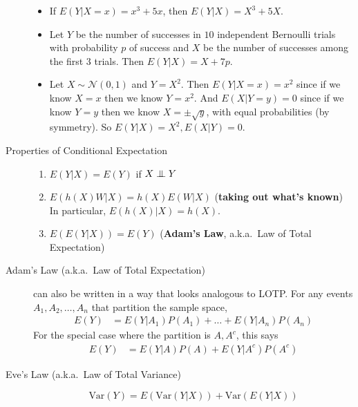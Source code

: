 \documentclass[10pt,landscape]{article}
\newcommand\independent{\protect\mathpalette{\protect\independenT}{\perp}}
\def\independenT#1#2{\mathrel{\setbox0\hbox{$#1#2$}%
    \copy0\kern-\wd0\mkern4mu\box0}}
\newcommand{\var}{\textrm{Var}}
\newcommand{\N}{\mathcal{N}}
\begin{document}
\begin{multicols*}{3}
\begin{description}
        \begin{itemize}
            \item If $E(Y|X=x) = x^3+5x$, then $E(Y|X) = X^3 + 5X$.
            \item Let $Y$ be the number of successes in $10$ independent Bernoulli trials with probability $p$ of success and $X$ be the number of successes among the first $3$ trials. Then $E(Y|X)=X+7p$.
            \item Let $X \sim \N(0,1)$ and $Y=X^2$. Then $E(Y|X=x) = x^2$ since if we know $X=x$ then we know $Y=x^2$. And $E(X|Y=y) = 0$ since if we know $Y=y$ then we know $X = \pm \sqrt{y}$, with equal probabilities (by symmetry). So $E(Y|X)=X^2, E(X|Y)=0$.  
        \end{itemize} 
                                                    
        \item[Properties of Conditional Expectation] \quad
        \begin{enumerate}
            \item $E(Y|X) = E(Y)$ if $X \independent Y$
            \item $E(h(X)W|X) = h(X)E(W|X)$ (\textbf{taking out what's known}) \\
                  In particular, $E(h(X)|X) = h(X)$.
            \item $E(E(Y|X)) = E(Y)$ (\textbf{Adam's Law}, a.k.a.~Law of Total Expectation)
        \end{enumerate}
                                                
        \item[Adam's Law (a.k.a.~Law of Total Expectation)]  can also be written in a way that looks analogous to LOTP. For any events $A_1, A_2, \dots, A_n$ that partition the sample space, 
        \begin{align*}
            E(Y) & = E(Y|A_1)P(A_1) + \dots + E(Y|A_n)P(A_n) 
        \end{align*}
        For the special case where the partition is $A, A^c$, this says
        \begin{align*}
            E(Y) & = E(Y|A)P(A) + E(Y|A^c)P(A^c) 
        \end{align*}
                                                
        \item[Eve's Law (a.k.a.~Law of Total Variance)] \quad
        \[\var(Y) = E(\var(Y|X)) + \var(E(Y|X))\]
    \end{description}


\end{multicols*}
\end{document}
